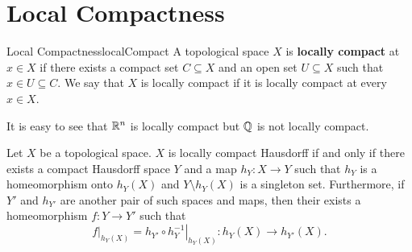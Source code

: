 \documentclass[math]{amznotes}
\theoremstyle{remark}
\begin{document}
\section{Local Compactness}
\begin{dfnbox}{Local Compactness}{localCompact}
    A topological space $X$ is {\color{red} \textbf{locally compact}} at $x \in X$ if there exists a compact set $C \subseteq X$ and an open set $U \subseteq X$ such that $x \in U \subseteq C$. We say that $X$ is locally compact if it is locally compact at every $x \in X$.
\end{dfnbox}
It is easy to see that $\mathbb{R}^n$ is locally compact but $\mathbb{Q}$ is not locally compact.
\begin{thmbox}{}{}
    Let $X$ be a topological space. $X$ is locally compact Hausdorff if and only if there exists a compact Hausdorff space $Y$ and a map $h_Y \colon X \to Y$ such that $h_Y$ is a homeomorphism onto $h_Y\left(X\right)$ and $Y \setminus h_Y\left(X\right)$ is a singleton set. Furthermore, if $Y'$ and $h_{Y'}$ are another pair of such spaces and maps, then their exists a homeomorphism $f \colon Y \to Y'$ such that 
    \begin{equation*}
        \left.f\right\rvert_{h_Y\left(X\right)} = h_{Y'} \circ \left.h_{Y}^{-1}\right\rvert_{h_Y\left(X\right)} \colon h_Y\left(X\right) \to h_{Y'}\left(X\right).
    \end{equation*}
\end{thmbox}
\end{document}
